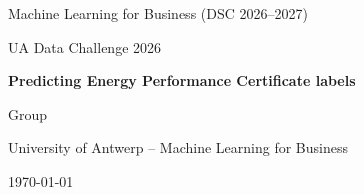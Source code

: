\begin{titlepage}
  \centering
  \vspace*{3cm}
  {\Large Machine Learning for Business (DSC 2026--2027)\par}
  \vspace{0.5cm}
  {\large UA Data Challenge 2026\par}
  \vspace{2cm}
  {\huge\bfseries Predicting Energy Performance Certificate labels\par}
  \vspace{0.5cm}
  {\large {}\par}
  \vspace{2cm}
  {\large Group \par}
  \vspace{0.5cm}
  {\large {} \quad {} \quad {}\par}
  \vfill
  {\large University of Antwerp -- Machine Learning for Business\par}
  {\large \today\par}
\end{titlepage}
